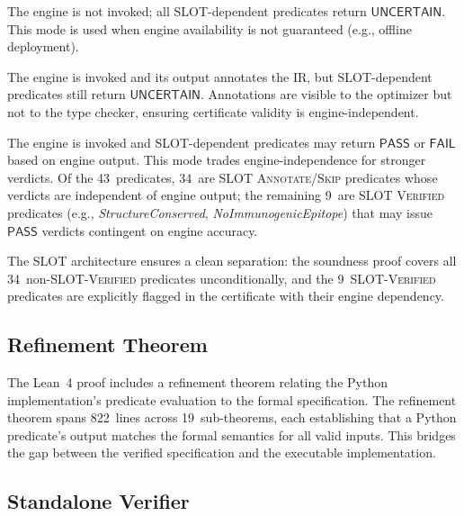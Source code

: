 \documentclass[acmsmall,review,anonymous]{acmart}
\newcommand{\PASS}{\ensuremath{\mathsf{PASS}}\xspace}
\newcommand{\FAIL}{\ensuremath{\mathsf{FAIL}}\xspace}
\newcommand{\UNCERTAIN}{\ensuremath{\mathsf{UNCERTAIN}}\xspace}
\begin{document}
\begin{description}[leftmargin=!,labelwidth=2.8cm,itemsep=1pt,topsep=1pt]
\item[SLOT \textsc{Skip}:]
The engine is not invoked; all SLOT-dependent predicates return
\UNCERTAIN.  This mode is used when engine availability is not
guaranteed (e.g., offline deployment).

\item[SLOT \textsc{Annotate}:]
The engine is invoked and its output annotates the IR, but
SLOT-dependent predicates still return \UNCERTAIN.  Annotations are
visible to the optimizer but not to the type checker, ensuring
certificate validity is engine-independent.

\item[SLOT \textsc{Verified}:]
The engine is invoked and SLOT-dependent predicates may return \PASS{}
or \FAIL{} based on engine output.  This mode trades engine-independence
for stronger verdicts.  Of the 43~predicates, 34~are SLOT
\textsc{Annotate}/\textsc{Skip} predicates whose verdicts are
independent of engine output; the remaining 9~are SLOT \textsc{Verified}
predicates (e.g., \emph{StructureConserved}, \emph{NoImmunogenicEpitope})
that may issue \PASS{} verdicts contingent on engine accuracy.
\end{description}

The SLOT architecture ensures a clean separation: the soundness proof
covers all 34~non-SLOT-\textsc{Verified} predicates unconditionally, and
the 9~SLOT-\textsc{Verified} predicates are explicitly flagged in the
certificate with their engine dependency.

\subsection{Refinement Theorem}

The Lean~4 proof includes a refinement theorem relating the Python
implementation's predicate evaluation to the formal specification.  The
refinement theorem spans 822~lines across 19~sub-theorems, each
establishing that a Python predicate's output matches the formal
semantics for all valid inputs.  This bridges the gap between the
verified specification and the executable implementation.

\subsection{Standalone Verifier}
\end{document}
